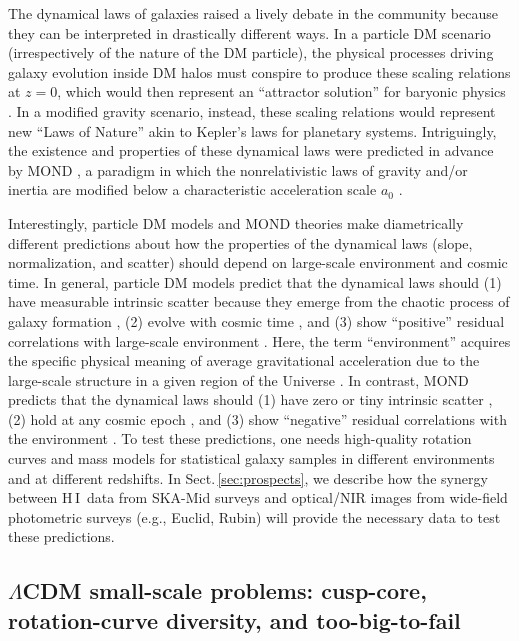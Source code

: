 \documentclass[a4paper,11pt]{article}
\newcommand{\hi } {{\rm H}\,{\small\rm I}}
\begin{document}
The dynamical laws of galaxies raised a lively debate in the community because they can be interpreted in drastically different ways. In a particle DM scenario (irrespectively of the nature of the DM particle), the physical processes driving galaxy evolution inside DM halos must conspire to produce these scaling relations at $z=0$, which would then represent an ``attractor solution'' for baryonic physics \citep[e.g.,][]{DiCintio2016, Ludlow2017}. In a modified gravity scenario, instead, these scaling relations would represent new ``Laws of Nature'' akin to Kepler’s laws for planetary systems. Intriguingly, the existence and properties of these dynamical laws were predicted in advance by MOND \citep{Milgrom1983b}, a paradigm in which the nonrelativistic laws of gravity and/or inertia are modified below a characteristic acceleration scale $a_0$ \citep[see][for reviews]{Famaey2012, Milgrom2014, Banik2022}. 

Interestingly, particle DM models and MOND theories make diametrically different predictions about how the properties of the dynamical laws (slope, normalization, and scatter) should depend on large-scale environment and cosmic time. In general, particle DM models predict that the dynamical laws should (1) have measurable intrinsic scatter because they emerge from the chaotic process of galaxy formation \citep{DiCintio2016, Garaldi2018, Dutton2019}, (2) evolve with cosmic time \citep{Keller2017, Pillepich2019, Mayer2023}, and (3) show ``positive'' residual correlations with large-scale environment \citep{Paranjape2022}. Here, the term ``environment'' acquires the specific physical meaning of average gravitational acceleration due to the large-scale structure in a given region of the Universe \citep{Desmond2018}. In contrast, MOND predicts that the dynamical laws should (1) have zero or tiny intrinsic scatter \citep{Milgrom1983b, Milgrom1994}, (2) hold at any cosmic epoch \citep{Hossenfelder2018}, and (3) show ``negative'' residual correlations with the environment \citep{Chae2020, Chae2021, Chae2022a}. To test these predictions, one needs high-quality rotation curves and mass models for statistical galaxy samples in different environments and at different redshifts. In Sect.\,\ref{sec:prospects}, we describe how the synergy between \hi\ data from SKA-Mid surveys and optical/NIR images from wide-field photometric surveys (e.g., Euclid, Rubin) will provide the necessary data to test these predictions.

\subsection{$\Lambda$CDM small-scale problems: cusp-core, rotation-curve diversity, and too-big-to-fail}\label{sec:cuspcore}
\end{document}

